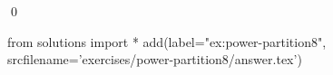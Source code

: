 
\begin{ex} 
  \label{ex:power-partition8}
  
  \qed
\end{ex} 
\begin{python0}
from solutions import *
add(label="ex:power-partition8",
    srcfilename='exercises/power-partition8/answer.tex') 
\end{python0}
